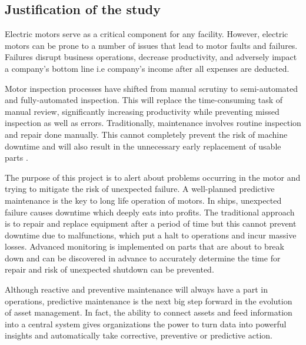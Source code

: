 \subsection{Justification of the study}
Electric motors serve as a critical component for any facility. However, electric motors can be prone to a number of issues that lead to motor faults and failures. Failures disrupt business operations, decrease productivity, and adversely impact a company’s bottom line i.e company's income after all expenses are deducted. 

Motor inspection processes have shifted from manual scrutiny to semi-automated and fully-automated inspection. This will replace the time-consuming task of manual review, significantly increasing productivity while preventing missed inspection as well as errors. Traditionally, maintenance involves routine inspection and repair done manually. This cannot completely prevent the risk of machine downtime and will also result in the unnecessary early replacement of usable parts \cite{sampaio_prediction_2019}.  

The purpose of this project is to alert about problems occurring in the motor and trying to mitigate the risk of unexpected failure. A well-planned predictive maintenance is the key to long life operation of motors. In ships, unexpected failure causes downtime which deeply eats into profits. The traditional approach is to repair and replace equipment after a period of time but this cannot prevent downtime due to malfunctions, which put a halt to operations and incur massive losses. Advanced monitoring is implemented on parts that are about to break down and can be discovered in advance to accurately determine the time for repair and risk of unexpected shutdown can be prevented. \cite{sampaio_prediction_2019}

Although reactive and preventive maintenance will always have a part in operations, predictive maintenance is the next big step forward in the evolution of asset management. In fact, the ability to connect assets and feed information into a central system gives organizations the power to turn data into powerful insights and automatically take corrective, preventive or predictive action.
